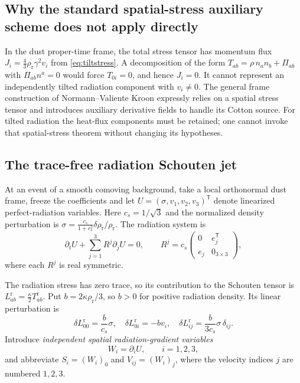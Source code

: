 \documentclass[11pt,a4paper]{article}
\begin{document}
\subsection{Why the standard spatial-stress auxiliary scheme does not apply directly}
In the dust proper-time frame, the
total stress tensor has momentum flux
$J_i=\frac43\rho_{\mathrm r}\gamma^2v_i$
from \eqref{eq:tiltstress}.
A decomposition of the form
$T_{ab}=\rho\,n_an_b+\Pi_{ab}$
with $\Pi_{ab}n^a=0$ would force
$T_{0i}=0$, and hence $J_i=0$.
It cannot represent an independently
tilted radiation component with
$v_i\ne0$.
The general frame construction of
Normann--Valiente Kroon
\cite{normann} expressly relies on
a spatial stress tensor and
introduces auxiliary derivative
fields to handle its Cotton source.
For tilted radiation the heat-flux
components must be retained; one
cannot invoke that spatial-stress
theorem without changing its
hypotheses.

\subsection{The trace-free radiation Schouten jet}
At an event of a smooth comoving
background, take a local
orthonormal dust frame, freeze the
coefficients and let
$U=(\sigma,v_1,v_2,v_3)^{\mathsf T}$
denote linearized perfect-radiation
variables. Here
$c_s=1/\sqrt3$ and the normalized
density perturbation is
$\sigma=\frac{c_s}{1+c_s^2}
\delta\rho_{\mathrm r}/\rho_{\mathrm r}$.
The radiation system is
\begin{equation}\label{eq:Rlinear}
\partial_t U+\sum_{j=1}^3 R^j\partial_j U=0,
\qquad
R^j=c_s
\begin{pmatrix}
0&e_j^{\mathsf T}\\
e_j&0_{3\times3}
\end{pmatrix},
\end{equation}
where each $R^j$ is real symmetric.

The radiation stress has zero trace,
so its contribution to the
Schouten tensor is
$L^{\mathrm r}_{ab}
=\frac{\kappa}{2}T^{\mathrm r}_{ab}$.
Put $b=2\kappa\rho_{\mathrm r}/3$,
so $b>0$ for positive radiation
density. Its linear perturbation is
\begin{equation}\label{eq:linear-schouten}
\delta L^{\mathrm r}_{00}
=\frac b{c_s}\sigma,\quad
\delta L^{\mathrm r}_{0i}=-bv_i,\quad
\delta L^{\mathrm r}_{ij}
=\frac b{3c_s}\sigma\,\delta_{ij}.
\end{equation}
Introduce \emph{independent spatial
radiation-gradient variables}
\begin{equation}\label{eq:jet}
W_i=\partial_iU,\qquad i=1,2,3,
\end{equation}
and abbreviate
$S_i=(W_i)_0$ and
$V_{ij}=(W_i)_j$,
where the velocity indices $j$
are numbered $1,2,3$.
\end{document}
